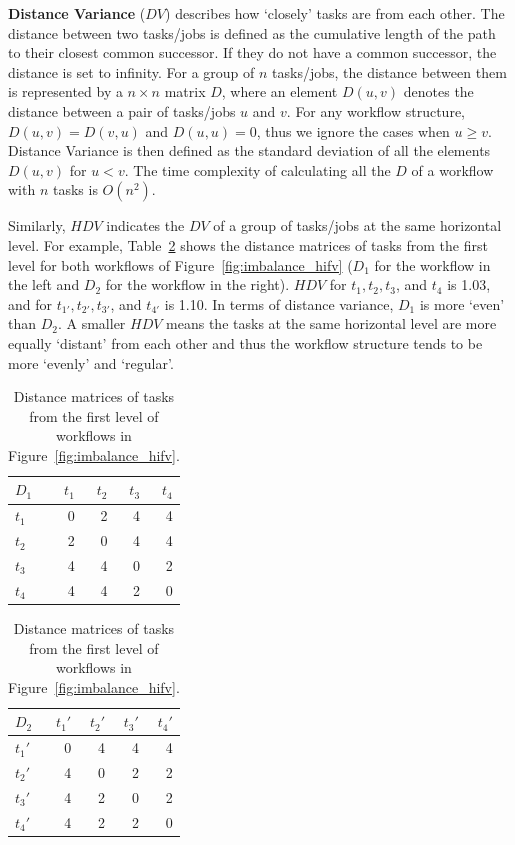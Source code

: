 \textbf{Distance Variance} ($DV$) describes how `closely' tasks are from each other. The distance between two tasks/jobs is defined as the cumulative length of the path to their closest common successor. If they do not have a common successor, the distance is set to infinity. For a group of $n$ tasks/jobs, the distance between them is represented by a $n \times n$ matrix $D$, where an element $D(u,v)$ denotes the distance between a pair of tasks/jobs $u$ and $v$. For any workflow structure, $D(u,v)=D(v,u)$ and $D(u,u)=0$, thus we ignore the cases when $u \geq v$. Distance Variance is then defined as the standard deviation of all the elements $D(u,v)$ for $u<v$. The time complexity of calculating all the $D$ of a workflow with $n$ tasks is $O(n^2)$. 

Similarly, $HDV$ indicates the $DV$ of a group of tasks/jobs at the same horizontal level. For example, Table~\ref{tab:imblance_metric} shows the distance matrices of tasks from the first level for both workflows of Figure~\ref{fig:imbalance_hifv} ($D_1$ for the workflow in the left and $D_2$ for the workflow in the right). $HDV$ for $t_1, t_2, t_3$, and $t_4$ is 1.03, and for $t_{1'}, t_{2'}, t_{3'}$, and $t_{4'}$ is 1.10. In terms of distance variance, $D_1$ is more `even' than $D_2$. A smaller $HDV$ means the tasks at the same horizontal level are more equally `distant' from each other and thus the workflow structure tends to be more `evenly' and `regular'. 

\begin{table}[htb]
	\footnotesize
	\centering
	\begin{tabular}{l|rrrr}
		$D_1$ & $t_1$ & $t_2$ & $t_3$ &$t_4$\\
		\hline
		$t_1$ & 0 & 2 & 4 & 4 \\
		$t_2$ & 2 & 0 & 4 & 4 \\
		$t_3$ & 4 & 4 & 0 & 2\\
		$t_4$ & 4 & 4 & 2 & 0 \\
	\end{tabular}
	\quad
	\begin{tabular}{l|rrrr}
		$D_2$ & $t_1'$ & $t_2'$ & $t_3'$ &$t_4'$\\
		\hline
		$t_1'$ & 0 & 4 & 4 & 4 \\
		$t_2'$ & 4 & 0 & 2 & 2 \\
		$t_3'$ & 4 & 2 & 0 & 2\\
		$t_4'$ & 4 & 2 & 2 & 0 \\
	\end{tabular}
	\caption{Distance matrices of tasks from the first level of workflows in Figure~\ref{fig:imbalance_hifv}.}
	\label{tab:imblance_metric}
\end{table}

